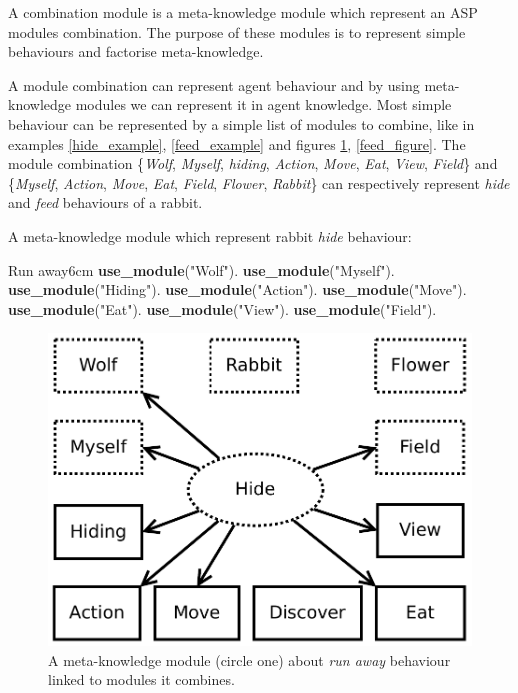 \documentclass{aamas2012}
\begin{document}
	\begin{definition}
		A combination module is a meta-knowledge module which represent an ASP modules combination.	
		The purpose of these modules is to represent simple behaviours and factorise meta-knowledge.
	\end{definition}
	
	A module combination can represent agent behaviour and by using meta-knowledge modules we can represent it in agent knowledge.
	Most simple behaviour can be represented by a simple list of modules to combine, like in examples \ref{hide_example}, 
	\ref{feed_example} and figures \ref{hide_figure}, \ref{feed_figure}.
	The module combination \{\emph{Wolf}, \emph{Myself}, \emph{hiding}, \emph{Action}, \emph{Move}, \emph{Eat}, \emph{View}, \emph{Field}\} 
	and \{\emph{Myself}, \emph{Action}, \emph{Move}, \emph{Eat}, \emph{Field}, \emph{Flower}, \emph{Rabbit}\} 
	can respectively represent \textit{hide} and \textit{feed} behaviours of a rabbit.
	
	\begin{example}
		\label{hide_example}
		A meta-knowledge module which represent rabbit \emph{hide} behaviour:\newline
		\begin{module}{Run away}{6cm}
			\textbf{use\_module}("Wolf").\newline
			\textbf{use\_module}("Myself").\newline
			\textbf{use\_module}("Hiding").\newline
			\textbf{use\_module}("Action").\newline
			\textbf{use\_module}("Move").\newline
			\textbf{use\_module}("Eat").\newline
			\textbf{use\_module}("View").\newline
			\textbf{use\_module}("Field").
		\end{module}
	\end{example}
	
	\begin{figure}
		\centering
		\includegraphics[keepaspectratio=true, scale=0.4]{hide.pdf}
		\caption
		{
			\label{hide_figure}
			A meta-knowledge module (circle one) about \textit{run away} behaviour linked to modules it combines.
		}
	\end{figure}
	
\end{document}
